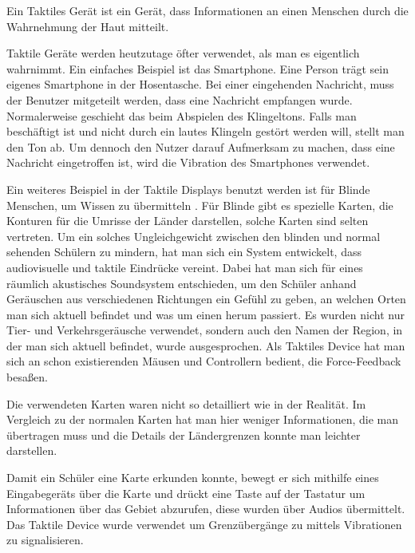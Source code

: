 
Ein Taktiles Ger{\"a}t ist ein Ger{\"a}t, dass Informationen an einen Menschen durch die Wahrnehmung der Haut mitteilt.\cite{gemperle2001design}

Taktile Ger{\"a}te werden heutzutage {\"o}fter verwendet, als man es eigentlich wahrnimmt. 
Ein einfaches Beispiel ist das Smartphone. 
Eine Person tr{\"a}gt sein eigenes Smartphone in der Hosentasche. 
Bei einer eingehenden Nachricht, muss der Benutzer mitgeteilt werden, dass eine Nachricht empfangen wurde.
Normalerweise geschieht das beim Abspielen des Klingeltons. Falls man besch{\"a}ftigt ist und nicht durch ein lautes Klingeln gest{\"o}rt werden will, stellt man den Ton ab. 
Um dennoch den Nutzer darauf Aufmerksam zu machen, dass eine Nachricht eingetroffen ist, wird die Vibration des Smartphones verwendet.

Ein weiteres Beispiel in der Taktile Displays benutzt werden ist f{\"u}r Blinde Menschen, um Wissen zu {\"u}bermitteln \cite{parente2003bats}. 
F{\"u}r Blinde gibt es spezielle Karten, die Konturen f{\"u}r die Umrisse der L{\"a}nder darstellen, solche Karten sind selten vertreten.
Um ein solches Ungleichgewicht zwischen den blinden und normal sehenden Sch{\"u}lern zu mindern, hat man sich ein System entwickelt, dass audiovisuelle und taktile Eindr{\"u}cke vereint. 
Dabei hat man sich f{\"u}r eines r{\"a}umlich akustisches Soundsystem entschieden, um den Sch{\"u}ler anhand Ger{\"a}uschen aus verschiedenen Richtungen ein Gef{\"u}hl zu geben, an welchen Orten man sich aktuell befindet und was um einen herum passiert. 
Es wurden nicht nur Tier- und Verkehrsger{\"a}usche verwendet, sondern auch den Namen der Region, in der man sich aktuell befindet, wurde ausgesprochen. 
Als Taktiles Device hat man sich an schon existierenden M{\"a}usen und Controllern bedient, die Force-Feedback besa{\ss}en. 

Die verwendeten Karten waren nicht so detailliert wie in der Realit{\"a}t.
Im Vergleich zu der normalen Karten hat man hier weniger Informationen, die man {\"u}bertragen muss und die Details der L{\"a}ndergrenzen konnte man leichter darstellen. 

Damit ein Sch{\"u}ler eine Karte erkunden konnte, bewegt er sich mithilfe eines Eingabeger{\"a}ts {\"u}ber die Karte und dr{\"u}ckt eine Taste auf der Tastatur um Informationen {\"u}ber das Gebiet abzurufen, diese wurden {\"u}ber Audios {\"u}bermittelt. Das Taktile Device wurde verwendet um Grenz{\"u}berg{\"a}nge zu mittels Vibrationen zu signalisieren.


